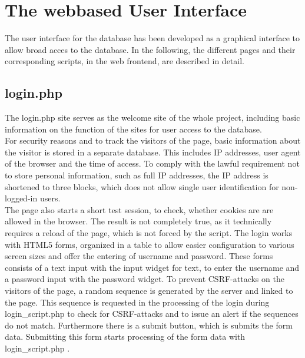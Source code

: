 
\section{The webbased User Interface}
The user interface for the database has been developed as a graphical interface to allow broad acces to the database. In the following, the different pages and their corresponding 
scripts, in the web frontend, are described in detail.


\subsection{login.php}
The login.php site serves as the welcome site of the whole project, including basic information on the function of the sites for user access to the database.\\
For security reasons and to track the visitors of the page, basic information about the visitor is stored in a separate database. This includes IP addresses, user agent of 
the browser and the time of access. To comply with the lawful requirement not to store personal information, such as full IP addresses, the IP address is shortened to three blocks,
which does not allow single user identification for non-logged-in users.\\
The page also starts a short test session, to check, whether cookies are are allowed in the browser. The result is not completely true, as it technically requires a reload of the 
page, which is not forced by the script.
The login works with HTML5 forms, organized in a table to allow easier configuration to various screen sizes and offer the entering of username and password. 
These forms consists of a text input with the input widget for text, to enter the username and a password input with the 
password widget. To prevent CSRF-attacks on the visitors of the page, a random sequence is generated by the server and linked to the page. This sequence is requested in the 
processing of the login during login\_script.php to check for CSRF-attacks and to issue an alert if the sequences do not match. 
Furthermore there is a submit button, which is submits the form data. Submitting this form starts processing of the form data with login\_script.php .

